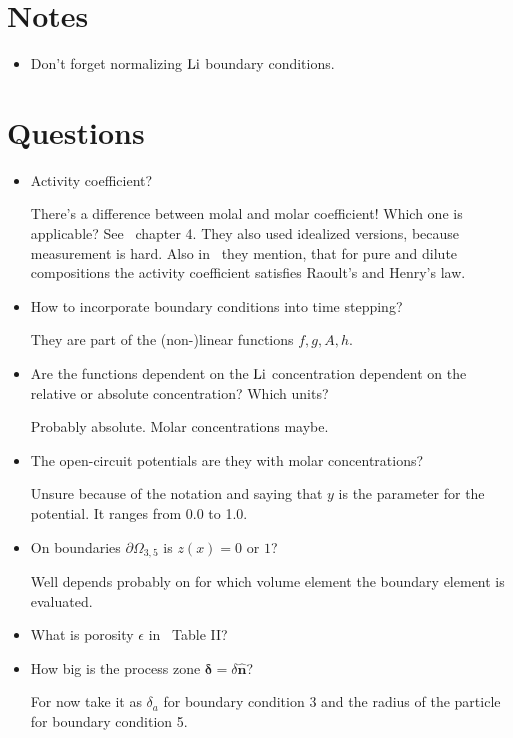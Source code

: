 \documentclass[a4paper,11pt]{scrartcl}
\newcommand*{\Li}{\ce{Li}}
\begin{document}
\section{Notes}
\begin{itemize}
\item Don't forget normalizing $\Li$ boundary conditions.
\end{itemize}
\section{Questions}
\begin{itemize}
\item Activity coefficient?

  There's a difference between molal and molar coefficient! Which one is applicable?
  See~\cite{doyle95} chapter 4.
  They also used idealized versions, because measurement is hard.
  Also in~\cite{garcia05} they mention, that for pure and dilute compositions
  the activity coefficient satisfies Raoult's and Henry's law.

\item How to incorporate boundary conditions into time stepping?

  They are part of the (non-)linear functions $f, g, A, h$.

\item Are the functions dependent on the $\Li$ concentration dependent on the
  relative or absolute concentration? Which units?

  Probably absolute. Molar concentrations maybe.

\item The open-circuit potentials are they with molar concentrations?

  Unsure because of the  notation and saying that $y$ is the
  parameter for the potential. It ranges from 0.0 to 1.0.

\item On boundaries $\partial\Omega_{3,5}$ is $z(x) = 0$ or $1$?

  Well depends probably on for which volume element the boundary element is evaluated.

\item What is porosity $\epsilon$ in~\cite{garcia05} Table II?

\item How big is the process zone $\boldsymbol{\delta} = \delta \boldsymbol{\hat{n}}$?

  For now take it as $\delta_a$ for boundary condition 3 and the radius of the
  particle for boundary condition 5.


\end{itemize}
\end{document}
